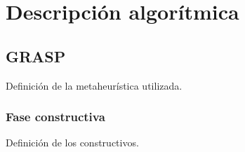 
\chapter{Descripción algorítmica} %

\label{Chapter3}


\section{GRASP}
Definición de la metaheurística utilizada.

\subsection{Fase constructiva}
Definición de los constructivos.



